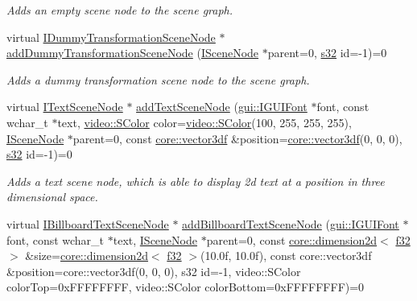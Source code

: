\begin{DoxyCompactItemize}
\begin{DoxyCompactList}\small\item\em Adds an empty scene node to the scene graph. \end{DoxyCompactList}\item 
virtual \hyperlink{classirr_1_1scene_1_1IDummyTransformationSceneNode}{I\+Dummy\+Transformation\+Scene\+Node} $\ast$ \hyperlink{classirr_1_1scene_1_1ISceneManager_ad7aa119894aa960f428b7baefcedc58a}{add\+Dummy\+Transformation\+Scene\+Node} (\hyperlink{classirr_1_1scene_1_1ISceneNode}{I\+Scene\+Node} $\ast$parent=0, \hyperlink{namespaceirr_ac66849b7a6ed16e30ebede579f9b47c6}{s32} id=-\/1)=0
\begin{DoxyCompactList}\small\item\em Adds a dummy transformation scene node to the scene graph. \end{DoxyCompactList}\item 
\mbox{\label{classirr_1_1scene_1_1ISceneManager_ae3a173f0b0dd97e69251a22b5e4fbc0f}} 
virtual \hyperlink{classirr_1_1scene_1_1ITextSceneNode}{I\+Text\+Scene\+Node} $\ast$ \hyperlink{classirr_1_1scene_1_1ISceneManager_ae3a173f0b0dd97e69251a22b5e4fbc0f}{add\+Text\+Scene\+Node} (\hyperlink{classirr_1_1gui_1_1IGUIFont}{gui\+::\+I\+G\+U\+I\+Font} $\ast$font, const wchar\+\_\+t $\ast$text, \hyperlink{classirr_1_1video_1_1SColor}{video\+::\+S\+Color} color=\hyperlink{classirr_1_1video_1_1SColor}{video\+::\+S\+Color}(100, 255, 255, 255), \hyperlink{classirr_1_1scene_1_1ISceneNode}{I\+Scene\+Node} $\ast$parent=0, const \hyperlink{namespaceirr_1_1core_a06f169d08b5c429f5575acb7edbad811}{core\+::vector3df} \&position=\hyperlink{namespaceirr_1_1core_a06f169d08b5c429f5575acb7edbad811}{core\+::vector3df}(0, 0, 0), \hyperlink{namespaceirr_ac66849b7a6ed16e30ebede579f9b47c6}{s32} id=-\/1)=0
\begin{DoxyCompactList}\small\item\em Adds a text scene node, which is able to display 2d text at a position in three dimensional space. \end{DoxyCompactList}\item 
virtual \hyperlink{classirr_1_1scene_1_1IBillboardTextSceneNode}{I\+Billboard\+Text\+Scene\+Node} $\ast$ \hyperlink{classirr_1_1scene_1_1ISceneManager_a82e91e414ac6ad4f4c0eaa5b17ce3a44}{add\+Billboard\+Text\+Scene\+Node} (\hyperlink{classirr_1_1gui_1_1IGUIFont}{gui\+::\+I\+G\+U\+I\+Font} $\ast$font, const wchar\+\_\+t $\ast$text, \hyperlink{classirr_1_1scene_1_1ISceneNode}{I\+Scene\+Node} $\ast$parent=0, const \hyperlink{classirr_1_1core_1_1dimension2d}{core\+::dimension2d}$<$ \hyperlink{namespaceirr_a0277be98d67dc26ff93b1a6a1d086b07}{f32} $>$ \&size=\hyperlink{classirr_1_1core_1_1dimension2d}{core\+::dimension2d}$<$ \hyperlink{namespaceirr_a0277be98d67dc26ff93b1a6a1d086b07}{f32} $>$(10.\+0f, 10.\+0f), const core\+::vector3df \&position=core\+::vector3df(0, 0, 0), s32 id=-\/1, video\+::\+S\+Color color\+Top=0x\+F\+F\+F\+F\+F\+F\+F\+F, video\+::\+S\+Color color\+Bottom=0x\+F\+F\+F\+F\+F\+F\+F\+F)=0

\end{DoxyCompactItemize}

